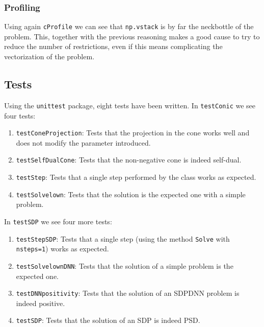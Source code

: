 \documentclass[paper=a4, fontsize=11pt]{scrartcl}
\numberwithin{equation}{section}		%
\numberwithin{figure}{section}			%
\numberwithin{table}{section}				%
\begin{document}
\subsubsection{Profiling}

Using again \texttt{cProfile} we can see that \texttt{np.vstack} is by far the neckbottle of the problem. This, together with the previous reasoning makes a good cause to try to reduce the number of restrictions, even if this means complicating the vectorization of the problem.

\subsection{Tests}

Using the \texttt{unittest} package, eight tests have been written.
In \texttt{testConic} we see four tests:
\begin{enumerate}
\item \texttt{testConeProjection}: Tests that the projection in the cone works well and does not modify the parameter introduced.
\item \texttt{testSelfDualCone}: Tests that the non-negative cone is indeed self-dual.
\item \texttt{testStep}: Tests that a single step performed by the class works as expected.
\item \texttt{testSolvelown}: Tests that the solution is the expected one with a simple problem.
\end{enumerate}
In \texttt{testSDP} we see four more tests:
\begin{enumerate}
\item \texttt{testStepSDP}: Tests that a single step (using the method \texttt{Solve} with \texttt{nsteps=1}) works as expected.
\item \texttt{testSolvelownDNN}: Tests that the solution of a simple problem is the expected one.
\item \texttt{testDNNpositivity}: Tests that the solution of an SDPDNN problem is indeed positive.
\item \texttt{testSDP}: Tests that the solution of an SDP is indeed PSD.
\end{enumerate}
\end{document}
